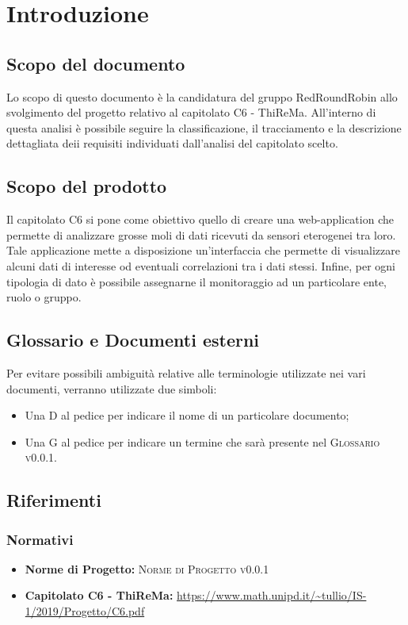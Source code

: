 \section{Introduzione}
	\subsection{Scopo del documento}
		Lo scopo di questo documento è la candidatura del gruppo RedRoundRobin allo svolgimento del progetto relativo al capitolato C6 - ThiReMa.
		All'interno di questa analisi è  possibile seguire la classificazione, il tracciamento e la descrizione dettagliata deii requisiti individuati dall'analisi del capitolato scelto.
	\subsection{Scopo del prodotto}
		Il capitolato C6 si pone come obiettivo quello di creare una web-application che permette di analizzare grosse moli di dati ricevuti da sensori eterogenei tra loro. Tale applicazione mette a disposizione un'interfaccia che permette di visualizzare alcuni dati di interesse od eventuali correlazioni tra i dati stessi. Infine, per ogni tipologia di dato è possibile assegnarne il monitoraggio ad un particolare ente, ruolo o gruppo.
	\subsection{Glossario e Documenti esterni}
		Per evitare possibili ambiguità relative alle terminologie utilizzate nei vari documenti, verranno utilizzate due simboli:
		\begin{itemize}
			\item Una \textsc{D} al pedice per indicare il nome di un particolare documento;
			\item Una \textsc{G} al pedice per indicare un termine che sarà presente nel \textsc{Glossario v0.0.1}.
		\end{itemize}
	\subsection{Riferimenti}
		\subsubsection{Normativi}
			\begin{itemize}
				\item \textbf{Norme di Progetto: }\textsc{Norme di Progetto v0.0.1} 
				\item \textbf{Capitolato C6 - ThiReMa: }\url{https://www.math.unipd.it/~tullio/IS-1/2019/Progetto/C6.pdf}
			\end{itemize}
